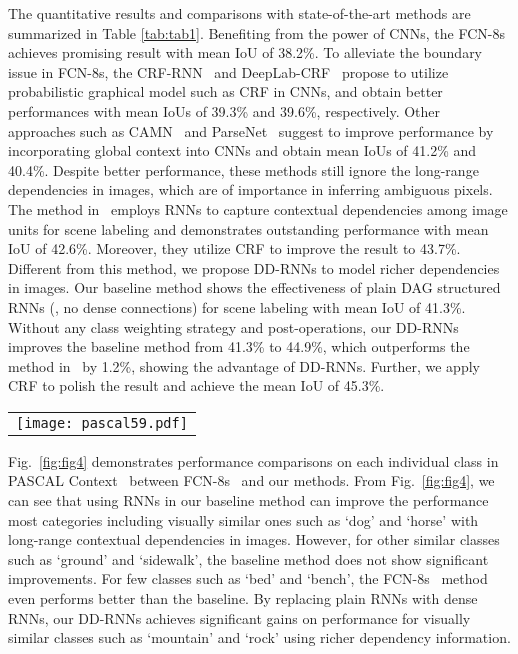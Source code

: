 \documentclass[10pt,twocolumn,letterpaper]{article}
\begin{document}
The quantitative results and comparisons with state-of-the-art methods are summarized in Table \ref{tab:tab1}. Benefiting from the power of CNNs, the FCN-8s~\cite{long2015fully} achieves promising result with mean IoU of 38.2\%. To alleviate the boundary issue in FCN-8s, the CRF-RNN~\cite{zheng2015conditional} and DeepLab-CRF~\cite{chen2016deeplab1} propose to utilize probabilistic graphical model such as CRF in CNNs, and obtain better performances with mean IoUs of 39.3\% and 39.6\%, respectively. Other approaches such as CAMN~\cite{abdulnabi2017episodic} and ParseNet~\cite{liu2015parsenet} suggest to improve performance by incorporating global context into CNNs and obtain mean IoUs of 41.2\% and 40.4\%. Despite better performance, these methods still ignore the long-range dependencies in images, which are of importance in inferring ambiguous pixels. The method in~\cite{shuai2017scene} employs RNNs to capture contextual dependencies among image units for scene labeling and demonstrates outstanding performance with mean IoU of 42.6\%. Moreover, they utilize CRF to improve the result to 43.7\%. Different from this method, we propose DD-RNNs to model richer dependencies in images. Our baseline method shows the effectiveness of plain DAG structured RNNs (\ie, no dense connections) for scene labeling with mean IoU of 41.3\%. Without any class weighting strategy and post-operations, our DD-RNNs improves the baseline method from 41.3\% to 44.9\%, which outperforms the method in~\cite{shuai2017scene} by 1.2\%, showing the advantage of DD-RNNs. Further, we apply CRF to polish the result and achieve the mean IoU of 45.3\%.

\begin{figure*}[!htb]
\centering
\begin{tabular}{c}
\texttt{[image: pascal59.pdf]}\\
\end{tabular}
\caption{Comparisons of IoU on PASCAL Context~\cite{mottaghi2014role} for each individual class. Best viewed in color.}
\label{fig:fig4}
\end{figure*}

Fig.~\ref{fig:fig4} demonstrates performance comparisons on each individual class in PASCAL Context~\cite{mottaghi2014role} between FCN-8s~\cite{long2015fully} and our methods. From Fig.~\ref{fig:fig4}, we can see that using RNNs in our baseline method can improve the performance most categories including visually similar ones such as `dog' and `horse' with long-range contextual dependencies in images. However, for other similar classes such as `ground' and `sidewalk', the baseline method does not show significant improvements. For few classes such as `bed' and `bench', the FCN-8s~\cite{long2015fully} method even performs better than the baseline. By replacing plain RNNs with dense RNNs, our DD-RNNs achieves significant gains on performance for visually similar classes such as `mountain' and `rock' using richer dependency information.
\end{document}
